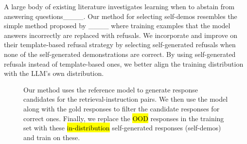 A large body of existing literature investigates learning when to abstain from answering questions____.
Our method for selecting self-demos resembles the simple method proposed by ____
where training examples that the model answers incorrectly are replaced with refusals. 
We incorporate and improve on their template-based refusal strategy by selecting self-generated refusals when none of the self-generated demonstrations are correct.
By using self-generated refusals instead of template-based ones, we better align the training distribution with the LLM's own distribution.

\begin{figure*}
  \centering
  \small
  
  \caption[Our method]{
    Our method uses the reference model to generate response candidates for the retrieval-instruction pairs.
    We then use the model along with the gold responses to filter the candidate responses for correct ones.
    Finally, we replace the \hl{OOD} responses in the training set 
    with these \hl{in-distribution} self-generated responses (self-demos) and train on these. 
  }
  \label{fig:method}
\end{figure*}
